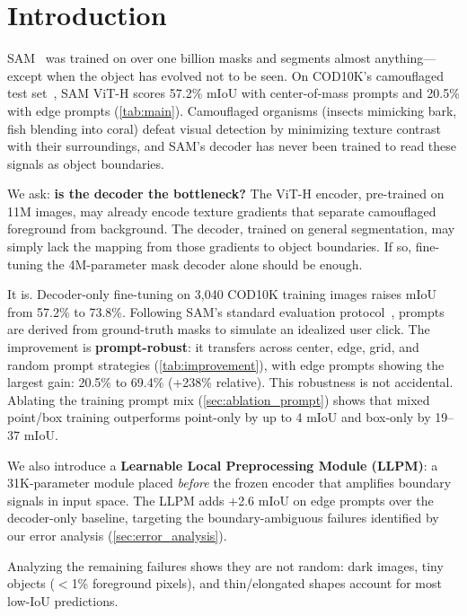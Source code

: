 \section{Introduction}

SAM~\cite{kirillov2023sam} was trained on over one billion masks and segments almost anything---except when the object has evolved not to be seen. On COD10K's camouflaged test set~\cite{fan2020cod10k}, SAM ViT-H scores 57.2\% mIoU with center-of-mass prompts and 20.5\% with edge prompts (\cref{tab:main}). Camouflaged organisms (insects mimicking bark, fish blending into coral) defeat visual detection by minimizing texture contrast with their surroundings, and SAM's decoder has never been trained to read these signals as object boundaries.

We ask: \textbf{is the decoder the bottleneck?} The ViT-H encoder, pre-trained on 11M images, may already encode texture gradients that separate camouflaged foreground from background. The decoder, trained on general segmentation, may simply lack the mapping from those gradients to object boundaries. If so, fine-tuning the 4M-parameter mask decoder alone should be enough.

It is. Decoder-only fine-tuning on 3,040 COD10K training images raises mIoU from 57.2\% to 73.8\%. Following SAM's standard evaluation protocol~\cite{kirillov2023sam}, prompts are derived from ground-truth masks to simulate an idealized user click. The improvement is \textbf{prompt-robust}: it transfers across center, edge, grid, and random prompt strategies (\cref{tab:improvement}), with edge prompts showing the largest gain: 20.5\% to 69.4\% (+238\% relative). This robustness is not accidental. Ablating the training prompt mix (\cref{sec:ablation_prompt}) shows that mixed point/box training outperforms point-only by up to 4 mIoU and box-only by 19--37 mIoU.

We also introduce a \textbf{Learnable Local Preprocessing Module (LLPM)}: a 31K-parameter module placed \emph{before} the frozen encoder that amplifies boundary signals in input space. The LLPM adds +2.6 mIoU on edge prompts over the decoder-only baseline, targeting the boundary-ambiguous failures identified by our error analysis (\cref{sec:error_analysis}).

Analyzing the remaining failures shows they are not random: dark images, tiny objects ($<$1\% foreground pixels), and thin/elongated shapes account for most low-IoU predictions.

